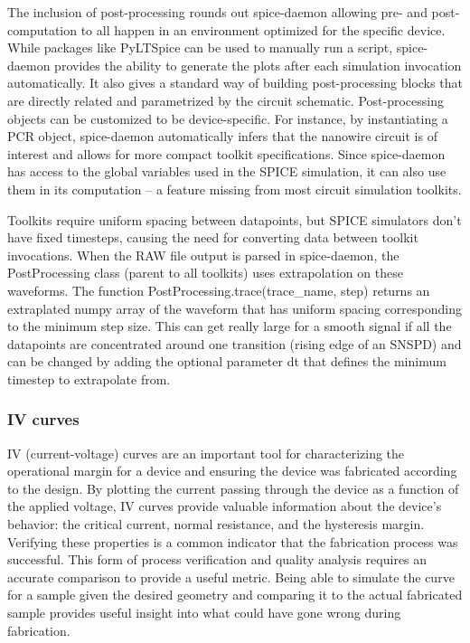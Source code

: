 \documentclass[]{article}
\newcommand{\cf}[1]{\textsf{#1}}
\begin{document}
The inclusion of post-processing rounds out spice-daemon allowing pre- and post-computation
to all happen in an environment optimized for the specific device. While
packages like \cf{PyLTSpice} can be used to manually 
run a script, spice-daemon
provides the ability to generate the plots after each simulation invocation automatically.
It also gives a standard way of building post-processing blocks that are directly related
and parametrized by the circuit schematic. 
Post-processing objects can be customized to be device-specific.
For instance, by instantiating a PCR object, spice-daemon automatically infers that 
the nanowire circuit is of interest and allows for more compact toolkit specifications.
Since spice-daemon has access to the global
variables used in the SPICE simulation, it can also use them in its computation -- a feature
missing from most circuit simulation toolkits.

Toolkits require uniform spacing between datapoints, but SPICE simulators don't have fixed timesteps, 
causing the need for converting data between toolkit invocations. When the RAW file output is parsed
in spice-daemon, the \cf{PostProcessing} class (parent to all toolkits) uses extrapolation on these
waveforms. The function \cf{PostProcessing.trace(trace\_name, step)} returns an extraplated \cf{numpy} 
array of the waveform that has uniform spacing corresponding to the minimum step size. This can
get really large for a smooth signal if all the datapoints are concentrated around one transition
(rising edge of an SNSPD) and can be changed by adding the optional parameter \cf{dt} that defines 
the minimum timestep to extrapolate from.

\subsubsection{IV curves}

IV (current-voltage) curves are an important tool for characterizing the operational margin for a device and ensuring the device was fabricated according to the design. By plotting the current passing through the device as a function of the applied voltage, 
IV curves provide valuable information about the device's behavior: the critical current, 
normal resistance, and the hysteresis margin. Verifying these properties is a common 
indicator that the fabrication process was successful. 
This form of process verification and quality analysis requires an accurate
comparison to provide a useful metric. Being able to simulate the curve for a sample given the desired geometry and comparing
it to the actual fabricated sample provides useful insight into what could have gone wrong during fabrication. 
\end{document}
